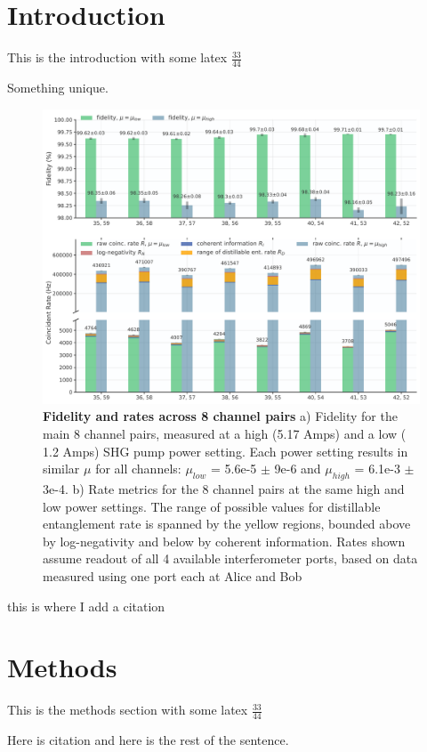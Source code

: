 \documentclass{optica-article}
\begin{document}
\section{Introduction}

This is the introduction with some latex \(\frac{33}{44}\)

Something unique.

\hypertarget{fig:channel_data}{%
\begin{figure}
\centering
\includegraphics[width=1\textwidth]{./figs_03/8ch_bar_graph_high_power_light.pdf}
\caption[{Fidelity and rates across 8 channel pairs.}]{\textbf{Fidelity and rates across 8 channel pairs} a) Fidelity for the main 8 channel pairs, measured at a high (5.17 Amps) and a low ( 1.2 Amps) SHG pump power setting. Each power setting results in similar \(\mu\) for all channels: \(\mu_{low}\) = 5.6e-5 \(\pm\) 9e-6 and \(\mu_{high}\) = 6.1e-3 \(\pm\) 3e-4. b) Rate metrics for the 8 channel pairs at the same high and low power settings. The range of possible values for distillable entanglement rate is spanned by the yellow regions, bounded above by log-negativity and below by coherent information. Rates shown assume readout of all 4 available interferometer ports, based on data measured using one port each at Alice and Bob}
\label{fig:channel_data}
\end{figure}
}

this is where I add a citation

\section{Methods}

This is the methods section with some latex \(\frac{33}{44}\)

Here is citation \cite{Dolinar2011Photon} and here is the rest of the sentence.


\end{document}
